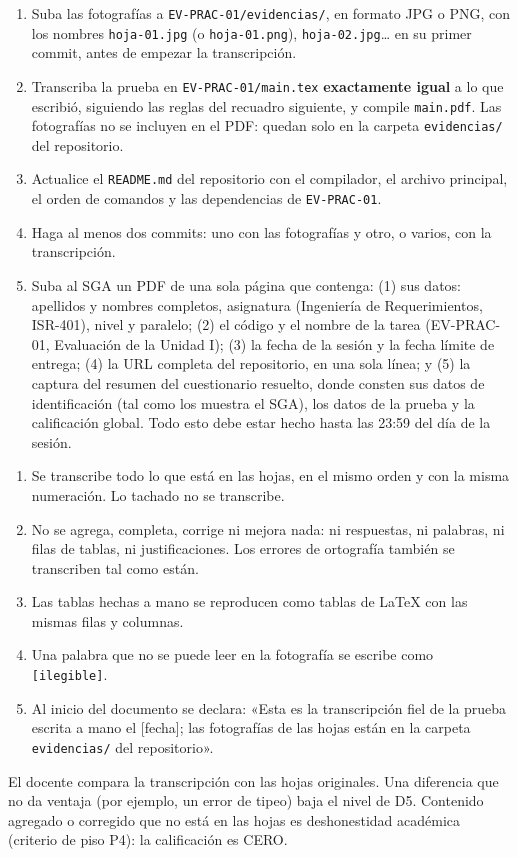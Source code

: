 \documentclass[11pt]{article}
\begin{document}
\begin{enumerate}[leftmargin=18pt,itemsep=2pt]
	\item Suba las fotografías a \texttt{EV-PRAC-01/evidencias/}, en formato JPG o PNG, con los nombres \texttt{hoja-01.jpg} (o \texttt{hoja-01.png}), \texttt{hoja-02.jpg}\ldots{} en su primer commit, antes de empezar la transcripción.
	\item Transcriba la prueba en \texttt{EV-PRAC-01/main.tex} \textbf{exactamente igual} a lo que escribió, siguiendo las reglas del recuadro siguiente, y compile \texttt{main.pdf}. Las fotografías no se incluyen en el PDF: quedan solo en la carpeta \texttt{evidencias/} del repositorio.
	\item Actualice el \texttt{README.md} del repositorio con el compilador, el archivo principal, el orden de comandos y las dependencias de \texttt{EV-PRAC-01}.
	\item Haga al menos dos commits: uno con las fotografías y otro, o varios, con la transcripción.
	\item Suba al SGA un PDF de una sola página que contenga: (1) sus datos: apellidos y nombres completos, asignatura (Ingeniería de Requerimientos, ISR-401), nivel y paralelo; (2) el código y el nombre de la tarea (EV-PRAC-01, Evaluación de la Unidad I); (3) la fecha de la sesión y la fecha límite de entrega; (4) la URL completa del repositorio, en una sola línea; y (5) la captura del resumen del cuestionario resuelto, donde consten sus datos de identificación (tal como los muestra el SGA), los datos de la prueba y la calificación global. Todo esto debe estar hecho hasta las 23:59 del día de la sesión.
\end{enumerate}

\begin{cajaaviso}[title={Reglas de la transcripción fiel}]
	\begin{enumerate}[label=\textbf{R\arabic*.},leftmargin=24pt,itemsep=2pt]
		\item Se transcribe todo lo que está en las hojas, en el mismo orden y con la misma numeración. Lo tachado no se transcribe.
		\item No se agrega, completa, corrige ni mejora nada: ni respuestas, ni palabras, ni filas de tablas, ni justificaciones. Los errores de ortografía también se transcriben tal como están.
		\item Las tablas hechas a mano se reproducen como tablas de \LaTeX{} con las mismas filas y columnas.
		\item Una palabra que no se puede leer en la fotografía se escribe como \texttt{[ilegible]}.
		\item Al inicio del documento se declara: «Esta es la transcripción fiel de la prueba escrita a mano el [fecha]; las fotografías de las hojas están en la carpeta \texttt{evidencias/} del repositorio».
	\end{enumerate}
	El docente compara la transcripción con las hojas originales. Una diferencia que no da ventaja (por ejemplo, un error de tipeo) baja el nivel de D5. Contenido agregado o corregido que no está en las hojas es deshonestidad académica (criterio de piso P4): la calificación es CERO.
\end{cajaaviso}
\end{document}
